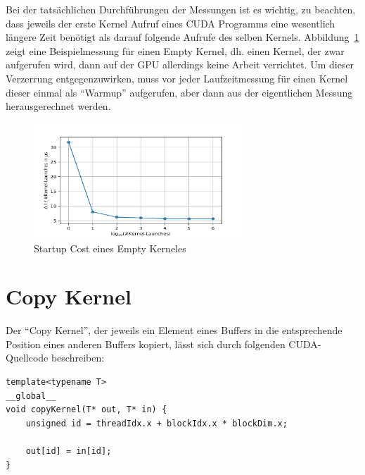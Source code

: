 \documentclass[11pt, abstract=on]{scrartcl}
\begin{document}
Bei der tatsächlichen Durchführungen der Messungen ist es wichtig, zu beachten, dass jeweils der erste Kernel Aufruf eines CUDA Programms eine wesentlich längere Zeit benötigt als darauf folgende Aufrufe des selben Kernels. Abbildung~\ref{fig:StartupCost} zeigt eine Beispielmessung für einen Empty Kernel, dh. einen Kernel, der zwar aufgerufen wird, dann auf der GPU allerdings keine Arbeit verrichtet. Um dieser Verzerrung entgegenzuwirken, muss vor jeder Laufzeitmessung für einen Kernel dieser einmal als "`Warmup"' aufgerufen, aber dann aus der eigentlichen Messung herausgerechnet werden.

\begin{figure} [htbp]
 	\centering
 		\includegraphics[width=0.7\textwidth]{Graph_Startup.png}
 	\caption{Startup Cost eines Empty Kerneles}
 	\label{fig:StartupCost}
\end{figure}

\section{Copy Kernel}

Der "`Copy Kernel"', der jeweils ein Element eines Buffers in die entsprechende Position eines anderen Buffers kopiert, lässt sich durch folgenden CUDA-Quellcode beschreiben:

\begin{lstlisting} 
template<typename T>
__global__
void copyKernel(T* out, T* in) {
	unsigned id = threadIdx.x + blockIdx.x * blockDim.x;
		
	out[id] = in[id];
}
\end{lstlisting}
\end{document}
